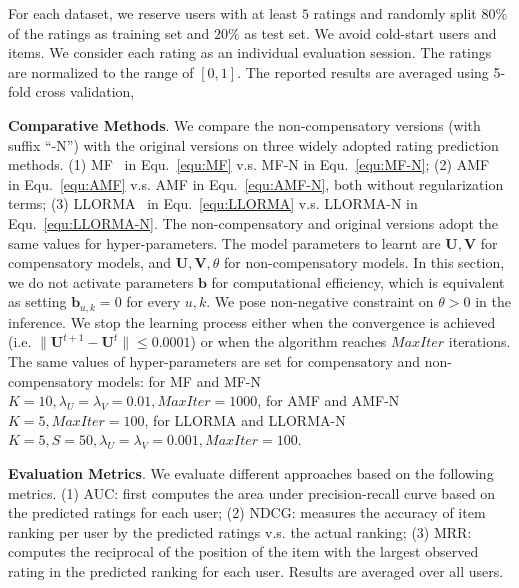 \documentclass[letterpaper]{article} %
\begin{document}
For each dataset, we reserve users with at least $5$ ratings and randomly split $80\%$ of the ratings as training set and $20\%$ as test set. We avoid cold-start users and items. We consider each rating as an individual evaluation session. The ratings are normalized to the range of $[0,1]$. The reported results are averaged using 5-fold cross validation, 
\begin{table}[htp]
\caption{Statistics of Datasets with ratings}
\small
\centering
{}
\label{tab:datasets}
\end{table}
\textbf{Comparative Methods}. We compare the non-compensatory versions (with suffix ``-N'') with the original versions on three widely adopted rating prediction methods. (1) MF~\cite{Koren2009Matrix} in Equ.~\ref{equ:MF} v.s. MF-N in Equ.~\ref{equ:MF-N};  (2) AMF~\cite{Koren2008Factorization} in Equ.~\ref{equ:AMF} v.s. AMF in Equ.~\ref{equ:AMF-N}, both without regularization terms; (3) LLORMA~\cite{Lee2016LLORMA} in Equ.~\ref{equ:LLORMA} v.s. LLORMA-N in Equ.~\ref{equ:LLORMA-N}. The non-compensatory and original versions adopt the same values for hyper-parameters. The model parameters to learnt are $\mathbf{U},\mathbf{V}$ for compensatory models, and  $\mathbf{U},\mathbf{V},\theta$ for non-compensatory models. In this section, we do not activate parameters $\mathbf{b}$ for computational efficiency, which is equivalent as setting $\mathbf{b}_{u,k}=0$ for every $u,k$. We pose non-negative constraint on $\theta>0$ in the inference. We stop the learning process either when the convergence is achieved (i.e. $\|\mathbf{U}^{t+1}-\mathbf{U}^t\|\leq 0.0001$) or when the algorithm reaches $MaxIter$ iterations. The same values of hyper-parameters are set for compensatory and non-compensatory models: for MF and MF-N $K=10, \lambda_U=\lambda_V=0.01,MaxIter=1000$, for AMF and AMF-N $K=5,MaxIter=100$, for LLORMA and LLORMA-N $K=5,S=50,\lambda_U=\lambda_V=0.001,MaxIter=100$.

\textbf{Evaluation Metrics}.  We evaluate different approaches based on the following metrics. (1) AUC: first computes the area under precision-recall curve based on the predicted ratings for each user; (2) NDCG: measures the accuracy of item ranking per user by the predicted ratings v.s. the actual ranking; (3)  MRR: computes the reciprocal of the position of the item with the largest observed rating in the predicted ranking for each user. Results are averaged over all users. 
\end{document}
